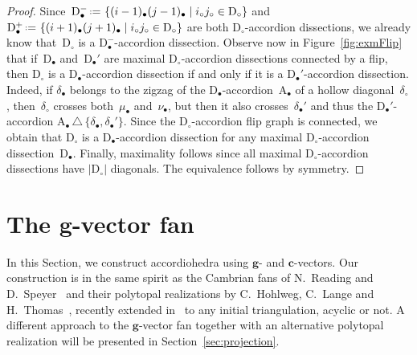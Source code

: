 \documentclass{amsart}
\theoremstyle{definition}
\renewcommand{\b}[1]{\mathbf{#1}} %
\newcommand{\set}[2]{\left\{ #1 \;\middle|\; #2 \right\}} %
\newcommand{\symdif}{\,\triangle\,} %
\newcommand{\eqdef}{\mbox{\,\raisebox{0.2ex}{\scriptsize\ensuremath{\mathrm:}}\ensuremath{=}\,}} %
\newcommand{\fref}[1]{Figure~\ref{#1}} %
\newcommand{\dissection}{\mathrm{D}} %
\newcommand{\accordion}{\mathrm{A}} %
\newcommand{\mi}{-} %
\newcommand{\ma}{+} %
\begin{document}
\begin{proof}
Since~$\dissection_\bullet^\mi \eqdef \set{(i-1)_\bullet (j-1)_\bullet}{i_\circ j_\circ \in \dissection_\circ}$ and~$\dissection_\bullet^\ma \eqdef \set{(i+1)_\bullet (j+1)_\bullet}{i_\circ j_\circ \in \dissection_\circ}$ are both \mbox{$\dissection_\circ$-ac}\-cordion dissections, we already know that~$\dissection_\circ$ is a \mbox{$\dissection_\bullet^\mi$-accor}\-dion dissection. Observe now in \fref{fig:exmFlip} that if~$\dissection_\bullet$ and~$\dissection_\bullet'$ are maximal $\dissection_\circ$-accordion dissections connected by a flip, then $\dissection_\circ$ is a $\dissection_\bullet$-accordion dissection if and only if it is a $\dissection_\bullet'$-accordion dissection. Indeed, if $\delta_\bullet$ belongs to the zigzag of the $\dissection_\bullet$-accordion~$\accordion_\bullet$ of a hollow diagonal~$\delta_\circ$, then~$\delta_\circ$ crosses both~$\mu_\bullet$ and~$\nu_\bullet$,  but then it also crosses~$\delta_\bullet'$ and thus the $\dissection_\bullet'$-accordion $\accordion_\bullet \symdif \{\delta_\bullet, \delta_\bullet'\}$. Since the $\dissection_\circ$-accordion flip graph is connected, we obtain that $\dissection_\circ$ is a $\dissection_\bullet$-accordion dissection for any maximal $\dissection_\circ$-accordion dissection~$\dissection_\bullet$. Finally, maximality follows since all maximal $\dissection_\circ$-accordion dissections have $|\dissection_\circ|$ diagonals. The equivalence follows by symmetry.
\end{proof}


\section{The $\b{g}$-vector fan}
\label{sec:gvectorFan}

In this Section, we construct accordiohedra using $\b{g}$- and $\b{c}$-vectors. Our construction is in the same spirit as the Cambrian fans of N.~Reading and D.~Speyer~\cite{Reading-CambrianLattices, Reading-sortableElements, ReadingSpeyer} and their polytopal realizations by C.~Hohlweg, C.~Lange and H.~Thomas~\cite{HohlwegLange, HohlwegLangeThomas}, recently extended in~\cite{HohlwegPilaudStella} to any initial triangulation, acyclic or not. A different approach to the $\b{g}$-vector fan together with an alternative polytopal realization will be presented in Section~\ref{sec:projection}.

\end{document}
